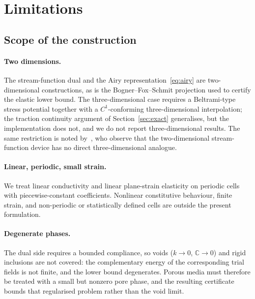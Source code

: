 
\section{Limitations}
\label{sec:limitations}

\subsection{Scope of the construction}

\paragraph{Two dimensions.} The stream-function dual and the Airy
representation~\eqref{eq:airy} are two-dimensional constructions, as is the
Bogner--Fox--Schmit projection used to certify the elastic lower bound. The
three-dimensional case requires a Beltrami-type stress potential together
with a $C^1$-conforming three-dimensional interpolation; the traction
continuity argument of Section~\ref{sec:exact} generalises, but the
implementation does not, and we do not report three-dimensional results.
The same restriction is noted by~\cite{Gaynutdinova2026}, who observe that
the two-dimensional stream-function device has no direct
three-dimensional analogue.

\paragraph{Linear, periodic, small strain.} We treat linear conductivity
and linear plane-strain elasticity on periodic cells with piecewise-constant
coefficients. Nonlinear constitutive behaviour, finite strain, and
non-periodic or statistically defined cells are outside the present
formulation.

\paragraph{Degenerate phases.} The dual side requires a bounded compliance,
so voids ($k \to 0$, $\mathbb{C} \to 0$) and rigid inclusions are not
covered: the complementary energy of the corresponding trial fields is not
finite, and the lower bound degenerates. Porous media must therefore be
treated with a small but nonzero pore phase, and the resulting certificate
bounds that regularised problem rather than the void limit.

